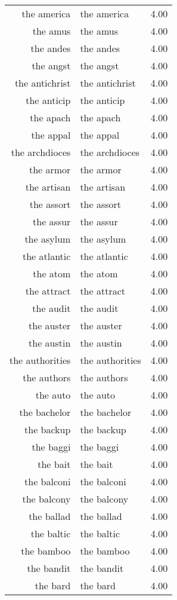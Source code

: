 \begin{table}[ht]
\begin{tabular}{rlr}
  the america & the america & 4.00 \\ 
  the amus & the amus & 4.00 \\ 
  the andes & the andes & 4.00 \\ 
  the angst & the angst & 4.00 \\ 
  the antichrist & the antichrist & 4.00 \\ 
  the anticip & the anticip & 4.00 \\ 
  the apach & the apach & 4.00 \\ 
  the appal & the appal & 4.00 \\ 
  the archdioces & the archdioces & 4.00 \\ 
  the armor & the armor & 4.00 \\ 
  the artisan & the artisan & 4.00 \\ 
  the assort & the assort & 4.00 \\ 
  the assur & the assur & 4.00 \\ 
  the asylum & the asylum & 4.00 \\ 
  the atlantic & the atlantic & 4.00 \\ 
  the atom & the atom & 4.00 \\ 
  the attract & the attract & 4.00 \\ 
  the audit & the audit & 4.00 \\ 
  the auster & the auster & 4.00 \\ 
  the austin & the austin & 4.00 \\ 
  the authorities & the authorities & 4.00 \\ 
  the authors & the authors & 4.00 \\ 
  the auto & the auto & 4.00 \\ 
  the bachelor & the bachelor & 4.00 \\ 
  the backup & the backup & 4.00 \\ 
  the baggi & the baggi & 4.00 \\ 
  the bait & the bait & 4.00 \\ 
  the balconi & the balconi & 4.00 \\ 
  the balcony & the balcony & 4.00 \\ 
  the ballad & the ballad & 4.00 \\ 
  the baltic & the baltic & 4.00 \\ 
  the bamboo & the bamboo & 4.00 \\ 
  the bandit & the bandit & 4.00 \\ 
  the bard & the bard & 4.00 \\ 

\end{tabular}
\end{table}

